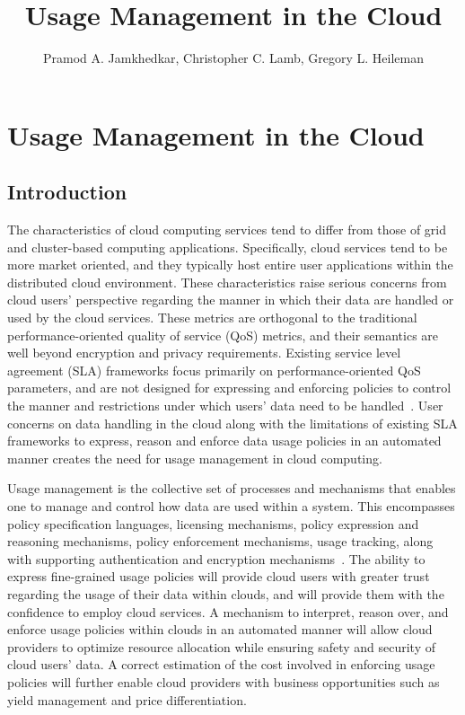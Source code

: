 \documentclass[10pt,letterpaper]{book}
\author{Pramod A. Jamkhedkar, Christopher C. Lamb, Gregory L. Heileman}
\title{Usage Management in the Cloud}
\begin{document}
\maketitle
\chapter{Usage Management in the Cloud}
\section{Introduction}
The characteristics of cloud computing services tend to differ from those of grid and cluster-based computing applications.  Specifically, cloud services tend to be more market oriented, and they typically host entire user applications within the distributed cloud environment. These characteristics raise serious concerns from cloud users' perspective regarding the manner in which their data are handled or used by the cloud services. These metrics are orthogonal to the traditional performance-oriented quality of service (QoS) metrics, and their semantics are well beyond encryption and privacy requirements. Existing service level agreement (SLA) frameworks focus primarily on performance-oriented QoS parameters, and are not designed for expressing and enforcing policies to control the manner and restrictions under which users' data need to be handled~\cite{WSA, WSLA, WSP,PaRaSh:09}. User concerns on data handling in the cloud along with the limitations of existing SLA frameworks to express, reason and enforce data usage policies in an automated manner creates the need for usage management in cloud computing. 
 
Usage management is the collective set of processes and mechanisms that enables one to manage and control how data are
used within a system. This encompasses policy specification languages, licensing mechanisms, policy expression and reasoning mechanisms, policy enforcement mechanisms, usage tracking, along with supporting authentication and encryption mechanisms~\cite{PaSa:04,JaHeLa:10}. The ability to express fine-grained usage policies will provide cloud users with greater trust regarding the usage of their data within clouds, and will provide them with the confidence to employ cloud services. A mechanism to interpret, reason over, and enforce usage policies within clouds in an automated manner will allow cloud providers to optimize resource allocation while ensuring safety and security of cloud users' data. A correct estimation of the cost involved in enforcing usage policies will further enable cloud providers with business opportunities such as yield management and price differentiation. 
\end{document}
